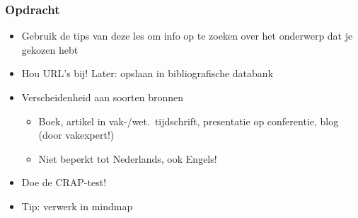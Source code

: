 \documentclass[aspectratio=169]{beamer}
\begin{document}
\begin{frame}
  \frametitle{Opdracht}

  \begin{itemize}
    \item Gebruik de tips van deze les om info op te zoeken over het onderwerp dat je gekozen hebt
    \item Hou URL's bij! Later: opslaan in bibliografische databank
    \item Verscheidenheid aan soorten bronnen
    \begin{itemize}
      \item Boek, artikel in vak-/wet.\ tijdschrift, presentatie op conferentie, blog (door vakexpert!)
      \item Niet beperkt tot Nederlands, ook Engels!
    \end{itemize}
    \item Doe de CRAP-test!
    \item Tip: verwerk in mindmap
  \end{itemize}

\end{frame}
\end{document}
